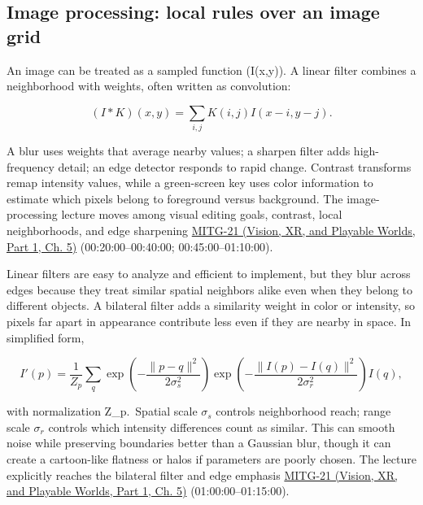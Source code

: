 \subsection{Image processing: local rules over an image grid}\label{03-visual-computing-i-ch004-image-processing-local-rules-over-an-image-grid}

\hypertarget{03-visual-computing-i-ch004-image-processing-local-rules-over-an-image-grid}{}

An image can be treated as a sampled function (I(x,y)). A linear filter combines a neighborhood with weights, often written as convolution:

\[
(I*K)(x,y)=\sum_{i,j}K(i,j)I(x-i,y-j).
\]

A blur uses weights that average nearby values; a sharpen filter adds high-frequency detail; an edge detector responds to rapid change. Contrast transforms remap intensity values, while a green-screen key uses color information to estimate which pixels belong to foreground versus background. The image-processing lecture moves among visual editing goals, contrast, local neighborhoods, and edge sharpening \href{../07-Vision-XR-and-Playable-Worlds-P01/main.pdf\#nameddest=04-visual-computing-ii-ch036-mitg-21---image-processing}{MITG-21 (Vision, XR, and Playable Worlds, Part 1, Ch. 5)} (00:20:00--00:40:00; 00:45:00--01:10:00).

Linear filters are easy to analyze and efficient to implement, but they blur across edges because they treat similar spatial neighbors alike even when they belong to different objects. A bilateral filter adds a similarity weight in color or intensity, so pixels far apart in appearance contribute less even if they are nearby in space. In simplified form,

\[
I'(p)=\frac{1}{Z_p}\sum_q \exp\!\left(-\frac{\|p-q\|^2}{2\sigma_s^2}\right)\exp\!\left(-\frac{\|I(p)-I(q)\|^2}{2\sigma_r^2}\right)I(q),
\]

with normalization Z\_p.~Spatial scale \(\sigma_s\) controls neighborhood reach; range scale \(\sigma_r\) controls which intensity differences count as similar. This can smooth noise while preserving boundaries better than a Gaussian blur, though it can create a cartoon-like flatness or halos if parameters are poorly chosen. The lecture explicitly reaches the bilateral filter and edge emphasis \href{../07-Vision-XR-and-Playable-Worlds-P01/main.pdf\#nameddest=04-visual-computing-ii-ch036-mitg-21---image-processing}{MITG-21 (Vision, XR, and Playable Worlds, Part 1, Ch. 5)} (01:00:00--01:15:00).

